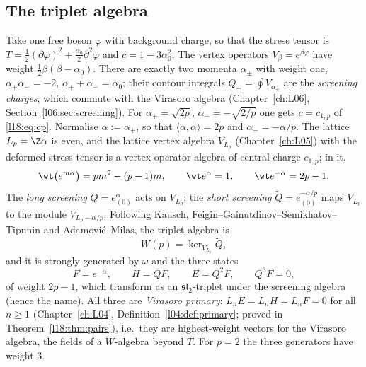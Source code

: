 \subsection{The triplet algebra}
Take one free boson $\varphi$ with background charge, so that the stress tensor is
$T=\frac12(\partial\varphi)^2+\frac{\alpha_0}{2}\partial^2\varphi$ and $c=1-3\alpha_0^2$. The vertex
operators $V_\beta=e^{\beta\varphi}$ have weight $\frac12\beta(\beta-\alpha_0)$. There are exactly two
momenta $\alpha_\pm$ with weight one, $\alpha_+\alpha_-=-2$, $\alpha_++\alpha_-=\alpha_0$; their
contour integrals $Q_\pm=\oint V_{\alpha_\pm}$ are the \emph{screening charges}, which commute with
the Virasoro algebra (Chapter~\ref{ch:L06}, Section~\ref{l06:sec:screening}). For
$\alpha_+=\sqrt{2p}$, $\alpha_-=-\sqrt{2/p}$ one gets $c=c_{1,p}$ of \eqref{l18:eq:cp}. Normalise
$\alpha:=\alpha_+$, so that $\langle\alpha,\alpha\rangle=2p$ and $\alpha_-=-\alpha/p$. The lattice
$L_p=\Z\alpha$ is even, and the lattice vertex algebra $V_{L_p}$ (Chapter~\ref{ch:L05}) with the
deformed stress tensor is a vertex operator algebra of central charge $c_{1,p}$; in it,
\begin{equation}\label{l18:eq:weights}
\wt\bigl(e^{m\alpha}\bigr)=pm^2-(p-1)m,\qquad \wt e^{\alpha}=1,\qquad \wt e^{-\alpha}=2p-1 .
\end{equation}
The \emph{long screening} $Q=e^{\alpha}_{(0)}$ acts on $V_{L_p}$; the \emph{short screening}
$\widetilde Q=e^{-\alpha/p}_{(0)}$ maps $V_{L_p}$ to the module $V_{L_p-\alpha/p}$. Following
Kausch, Feigin--Gainutdinov--Semikhatov--Tipunin and Adamovi\'c--Milas, the triplet algebra is
\begin{equation}\label{l18:eq:Wp}
W(p)=\ker_{V_{L_p}}\widetilde Q,
\end{equation}
and it is strongly generated by $\omega$ and the three states
\begin{equation}\label{l18:eq:EHF}
F=e^{-\alpha},\qquad H=QF,\qquad E=Q^2F,\qquad Q^3F=0,
\end{equation}
of weight $2p-1$, which transform as an $\mathfrak{sl}_2$-triplet under the screening algebra (hence
the name). All three are \emph{Virasoro primary}: $L_nE=L_nH=L_nF=0$ for all $n\ge1$ (Chapter~\ref{ch:L04},
Definition~\ref{l04:def:primary}; proved in Theorem~\ref{l18:thm:pairs}), i.e.\ they are highest-weight
vectors for the Virasoro algebra, the fields of a $W$-algebra beyond $T$. For $p=2$ the three generators have weight $3$.

